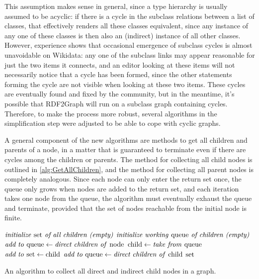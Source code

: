 This assumption makes sense in general,
since a type hierarchy is usually assumed to be acyclic:
if there is a cycle in the subclass relations between a list of classes,
that effectively renders all these classes equivalent,
since any instance of any one of these classes is then also an (indirect) instance of all other classes.
However, experience shows %
that occasional emergence of subclass cycles is almost unavoidable on Wikidata:
any one of the subclass links may appear reasonable for just the two items it connects,
and an editor looking at these items will not necessarily notice that a cycle has been formed,
since the other statements forming the cycle are not visible when looking at these two items.
These cycles are eventually found and fixed by the community,
but in the meantime, it’s possible that RDF2Graph will run on a subclass graph containing cycles.
Therefore, to make the process more robust, %
several algorithms in the simplification step were adjusted to be able to cope with cyclic graphs.

A general component of the new algorithms are methods to get all children and parents of a node,
in a matter that is guaranteed to terminate even if there are cycles among the children or parents.
The method for collecting all child nodes is outlined in \cref{alg:GetAllChildren},
and the method for collecting all parent nodes is completely analogous.
Since each node can only enter the return set once,
the queue only grows when nodes are added to the return set,
and each iteration takes one node from the queue,
the algorithm must eventually exhaust the queue and terminate,
provided that the set of nodes reachable from the initial node is finite.

\begin{algorithm}
  \begin{algorithmic}
    \State $\text{\textit{initialize \textup{set} of all children (empty)}}$
    \State $\text{\textit{initialize working \textup{queue} of children (empty)}}$
    \State $\text{\textit{add to \textup{queue}}} \gets \text{\textit{direct children of \textup{node}}}$
    \State $\textup{child} \gets \text{\textit{take from \textup{queue}}}$
    \State $\text{\textit{add to \textup{set}}} \gets \textup{child}$
    \State $\text{\textit{add to \textup{queue}}} \gets \text{\textit{direct children of \textup{child}}}$
    \EndIf
    \EndWhile
    \State \Return $\text{\textit{\textup{set}}}$
    \EndFunction
  \end{algorithmic}
  \caption{An algorithm to collect all direct and indirect child nodes in a graph.}
  \label{alg:GetAllChildren}
\end{algorithm}

